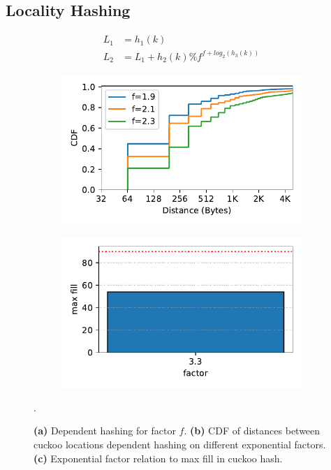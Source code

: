 \subsection{Locality Hashing}
\begin{figure}[t]
    \centering
    \begin{subfigure}{0.3\linewidth}
        \begin{align*}
            L_1 &= h_1(k) \\
            L_2 &= L_1 + h_2(k) \% f^{f + log_2(h_3(k))}
        \end{align*}
        \label{fig:hash_factor}
    \end{subfigure}
    \begin{subfigure}{0.3\linewidth}
        \includegraphics[width=0.99\linewidth]{fig/hash_factor.pdf}
        \label{fig:hash_factor}
    \end{subfigure}
    \begin{subfigure}{0.3\linewidth}
        \includegraphics[width=0.99\linewidth]{fig/hash_fill.pdf}
        \label{fig:hash_fill}
    \end{subfigure}.
    \vspace{-1em}
    \caption{
    \textbf{(a)} Dependent hashing for factor $f$.
    \textbf{(b)} CDF of distances between cuckoo locations dependent hashing on different exponential factors.
    \textbf{(c)} Exponential factor relation to max fill in cuckoo hash.
    }
    \label{fig:locality-hashing}

\end{figure}

